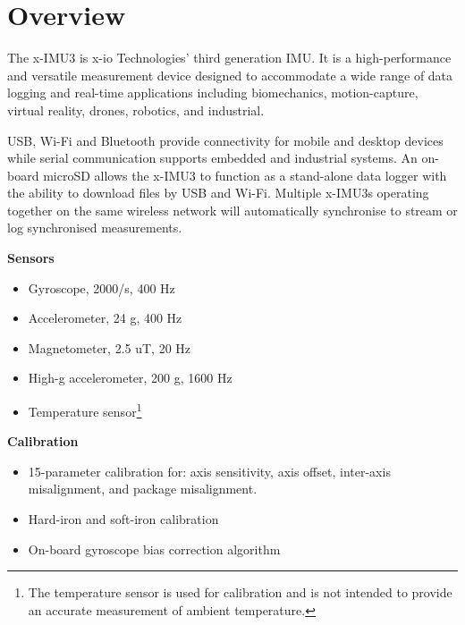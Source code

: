 \section{Overview}

\begin{multicols}{2}

The x-IMU3 is x-io Technologies' third generation \ac{IMU}.  It is a high-performance and versatile measurement device designed to accommodate a wide range of data logging and real-time applications including biomechanics, motion-capture, virtual reality, drones, robotics, and industrial.

\acs{USB}, Wi-Fi and Bluetooth provide connectivity for mobile and desktop devices while serial communication supports embedded and industrial systems.  An on-board \acs{microSD} allows the x-IMU3 to function as a stand-alone data logger with the ability to download files by USB and Wi-Fi.  Multiple x-IMU3s operating together on the same wireless network will automatically synchronise to stream or log synchronised measurements.

\textbf{Sensors}
\begin{itemize}[nolistsep]
    \item Gyroscope, \textpm{}2000\textdegree{}/s, 400 Hz
    \item Accelerometer, \textpm{}24 g, 400 Hz
    \item Magnetometer, \textpm{}2.5 uT, 20 Hz
    \item High-g accelerometer, \textpm{}200 g, 1600 Hz
    \item Temperature sensor\footnote{The temperature sensor is used for calibration and is not intended to provide an accurate measurement of ambient temperature.}
\end{itemize}

\textbf{Calibration}
\begin{itemize}[nolistsep]
    \item 15-parameter calibration for: axis sensitivity, axis offset, inter-axis misalignment, and package misalignment.
    \item Hard-iron and soft-iron calibration
    \item On-board gyroscope bias correction algorithm
\end{itemize}


\end{multicols}
